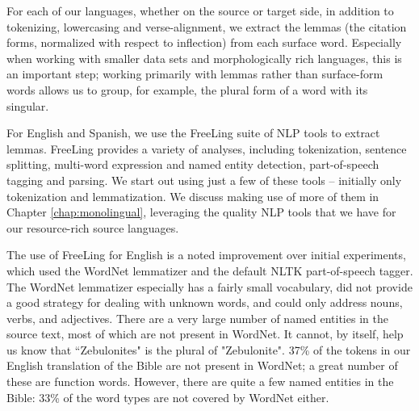 For each of our languages, whether on the source or target side, in addition to
tokenizing, lowercasing and verse-alignment, we extract the lemmas (the
citation forms, normalized with respect to inflection) from each surface word.
Especially when working with smaller data sets and morphologically rich
languages, this is an important step; working primarily with lemmas rather than
surface-form words allows us to group, for example, the plural form of a word
with its singular.

For English and Spanish, we use the FreeLing suite of NLP tools
\cite{padro12} to extract lemmas. FreeLing provides a variety of analyses,
including tokenization, sentence splitting, multi-word expression and named
entity detection, part-of-speech tagging and parsing.  We start out using just
a few of these tools -- initially only tokenization and lemmatization. We
discuss making use of more of them in Chapter \ref{chap:monolingual},
leveraging the quality NLP tools that we have for our resource-rich source
languages.

The use of FreeLing for English is a noted improvement over initial
experiments, which used the WordNet lemmatizer and the default NLTK
part-of-speech tagger.
The WordNet lemmatizer especially has a fairly small vocabulary, did not
provide a good strategy for dealing with unknown words, and could only address
nouns, verbs, and adjectives.
There are a very large number of named entities in the source text, most of
which are not present in WordNet. It cannot, by itself, help us know that
``Zebulonites" is the plural of "Zebulonite". 
37\% of the tokens in our English translation of the Bible are not present in
WordNet; a great number of these are function words. However, there are quite a
few named entities in the Bible: 33\% of the word types are not covered by
WordNet either.

